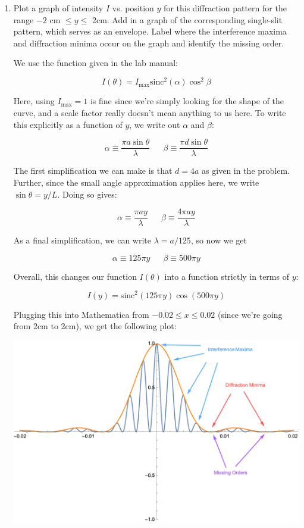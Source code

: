 \documentclass[10pt]{article}
\newcommand{\sinc}{\mathrm{sinc}}
\begin{document}
    \begin{enumerate}[resume, label=\alph*)]
        \item Plot a graph of intensity $I$ vs. position $y$ for this diffraction pattern for the range $-2$ cm $\le y \le$ 2cm. Add in a graph of the corresponding single-slit pattern, which serves as an envelope. Label where the interference maxima and diffraction minima occur on the graph and identify the missing order. 
        

        \begin{solution}
            We use the function given in the lab manual:

            \[ I(\theta) = I_{\text{max}}\sinc^2(\alpha) \cos^2 \beta\]

            Here, using $I_{\text{max}} = 1$ is fine since we're simply looking for the shape of the curve, and a scale factor really doesn't mean anything to us here. To write this explicitly as a function of $y$, we write out $\alpha$ and $\beta$:
            
            \[ \alpha \equiv \frac{\pi a \sin \theta}{\lambda} \phantom{aaa} \beta \equiv \frac{\pi d \sin \theta}{\lambda}\] 

            The first simplification we can make is that $d = 4a$ as given in the problem. Further, since the small angle approximation applies here, we write $\sin \theta = y/L$. Doing so gives:

            \[ \alpha \equiv \frac{\pi a y}{\lambda} \phantom{aaa} \beta \equiv \frac{4 \pi a y}{\lambda}\] 

            As a final simplification, we can write $\lambda = a/125$, so now we get

            \[ \alpha \equiv 125 \pi y \phantom{aaa} \beta \equiv 500 \pi y\]

            Overall, this changes our function $I(\theta)$ into a function strictly in terms of $y$:

            \[ I(y) = \sinc^2(125 \pi y) \cos (500 \pi y )\]

            Plugging this into Mathematica from $-0.02 \le x \le 0.02$ (since we're going from 2cm to 2cm), we get the following plot:

            \begin{center}
                \includegraphics[scale=0.7]{plot.png}
            \end{center}


\end{solution}
\end{enumerate}
\end{document}
